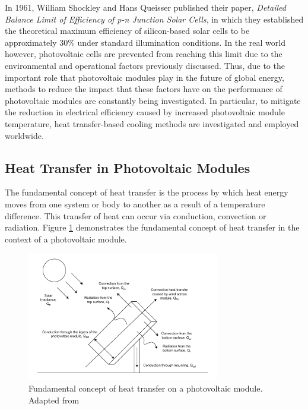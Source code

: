 In 1961, William Shockley and Hans Queisser published their paper, \textit{Detailed Balance Limit of Efficiency of p-n Junction Solar Cells}, in which they established the theoretical maximum efficiency of silicon-based solar cells to be approximately 30\% under standard illumination conditions. \cite{Shockley1961DetailedCells} In the real world however, photovoltaic cells are prevented from reaching this limit due to the environmental and operational factors previously discussed. Thus, due to the important role that photovoltaic modules play in the future of global energy, methods to reduce the impact that these factors have on the performance of photovoltaic modules are constantly being investigated. In particular, to mitigate the reduction in electrical efficiency caused by increased photovoltaic module temperature, heat transfer-based cooling methods are investigated and employed worldwide.\vspace{0.5em}

\pagebreak
\subsection{Heat Transfer in Photovoltaic Modules}
The fundamental concept of heat transfer is the process by which heat energy moves from one system or body to another as a result of a temperature difference. This transfer of heat can occur via conduction, convection or radiation. Figure \ref{fig:fundamental_concept_of_heat_transfer_diagram} demonstrates the fundamental concept of heat transfer in the context of a photovoltaic module.\vspace{0.5em}

\begin{figure}[h]
    \centering
    \includegraphics[width=0.75\textwidth]{Figures/fundamental_concept_of_heat_transfer_diagram.pdf}
    \caption{Fundamental concept of heat transfer on a photovoltaic module. Adapted from \cite{HonsbergHeatModules}}
    \label{fig:fundamental_concept_of_heat_transfer_diagram}
\end{figure}

